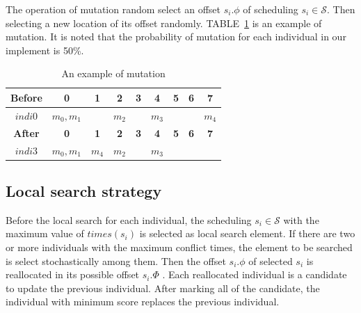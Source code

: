 \documentclass[journal]{IEEEtran}
\newcommand{\calS}{\mathcal{S}}
\begin{document}
The operation of mutation random select an offset $s_i.\phi$ of scheduling $s_i\in\calS$.
Then selecting a new location of its offset randomly.
TABLE~\ref{t:mutation} is an example of mutation.
It is noted that the probability of mutation for each individual in our implement is 50\%.
\begin{table}[!t]
	\renewcommand{\arraystretch}{1.3}
	\newcommand{\tabincell}[2]{\begin{tabular}{@{}#1@{}}#2\end{tabular}}
	\caption{An example of mutation}
	\label{t:mutation}
	\centering
	\begin{tabular}{|c||c||c||c||c||c||c||c||c|}
		\hline
		\textbf{Before}& 
		\textbf{0} & 
		\textbf{1} & 
		\textbf{2} & 
		\textbf{3} &
		\textbf{4} & 
		\textbf{5} & 
		\textbf{6} & 
		\textbf{7} \\		
		\hline
		$indi0$	&$m_0,m_1$&	&$m_2$&	&$m_3$& & &$m_4$\\		
		\hline
		\hline
		\textbf{After}& 
		\textbf{0} & 
		\textbf{1} & 
		\textbf{2} & 
		\textbf{3} &
		\textbf{4} & 
		\textbf{5} & 
		\textbf{6} & 
		\textbf{7} \\		
		\hline
		$indi3$	&$m_0,m_1$&$m_4$&$m_2$&	&$m_3$& & &\\			
		\hline
	\end{tabular}
\end{table}


\subsection{Local search strategy \label{s:loc}}

Before the local search for each individual,
 the scheduling $s_i\in\calS$ with the maximum value of $times(s_i)$ is selected as local search element.
If there are two or more individuals with the maximum conflict times,
 the element to be searched is select stochastically among them.
Then the offset $s_i.\phi$ of selected $s_i$ is reallocated in its possible offset $s_i.\Phi$ .
Each reallocated individual is a candidate to update the previous individual.
After marking all of the candidate, the individual with minimum score replaces the previous individual.
\end{document}
